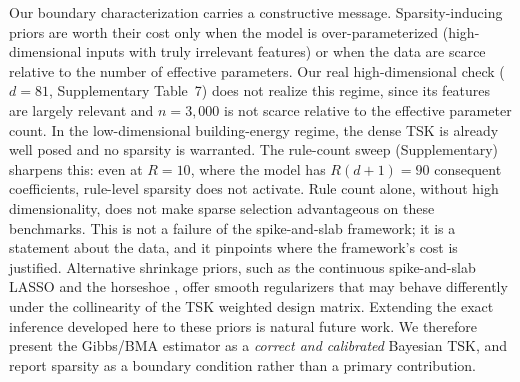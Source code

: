 \documentclass[review,1p,times]{elsarticle}
\begin{document}
Our boundary characterization carries a constructive message.
Sparsity-inducing priors are worth their cost only when the model is over-parameterized (high-dimensional inputs with truly irrelevant features) or when the data are scarce relative to the number of effective parameters.
Our real high-dimensional check ($d=81$, Supplementary Table~7) does not realize this regime, since its features are largely relevant and $n=3{,}000$ is not scarce relative to the effective parameter count. In the low-dimensional building-energy regime, the dense TSK is already well posed and no sparsity is warranted.
The rule-count sweep (Supplementary) sharpens this: even at $R=10$, where the model has $R(d{+}1)=90$ consequent coefficients, rule-level sparsity does not activate.
Rule count alone, without high dimensionality, does not make sparse selection advantageous on these benchmarks. This is not a failure of the spike-and-slab framework; it is a statement about the data, and it pinpoints where the framework's cost is justified.
Alternative shrinkage priors, such as the continuous spike-and-slab LASSO \cite{rockova2018spikeslab} and the horseshoe \cite{carvalho2010horseshoe}, offer smooth regularizers that may behave differently under the collinearity of the TSK weighted design matrix.
Extending the exact inference developed here to these priors is natural future work. We therefore present the Gibbs/BMA estimator as a \emph{correct and calibrated} Bayesian TSK, and report sparsity as a boundary condition rather than a primary contribution.
\end{document}
